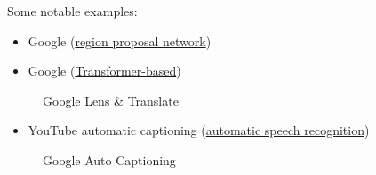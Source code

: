 \documentclass[
  paper=6in:9in,
  pagesize=pdftex,
  headinclude=on,
  footinclude=on,
  12pt]{scrbook}
\providecommand{\tightlist}{%
  \setlength{\itemsep}{0pt}\setlength{\parskip}{0pt}}\usepackage{longtable,booktabs,array}
\begin{document}
Some notable examples:

\begin{itemize}
\tightlist
\item
  Google (\href{https://arxiv.org/abs/1506.01497v3}{region proposal
  network})
\item
  Google (\href{https://arxiv.org/abs/2205.03983}{Transformer-based})
\end{itemize}

\begin{figure}[H]


\caption{\label{fig-ml-google-1}Google Lens \& Translate}

\end{figure}%

\begin{itemize}
\tightlist
\item
  YouTube automatic captioning
  (\href{https://arxiv.org/abs/2005.08100}{automatic speech
  recognition})
\end{itemize}

\begin{figure}[H]


\caption{\label{fig-ml-google-2}Google Auto Captioning}

\end{figure}%
\end{document}
